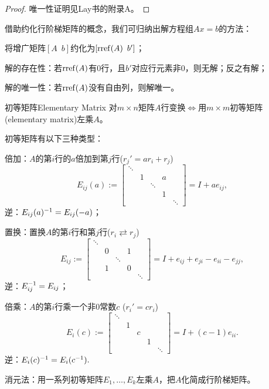 \begin{proof}
	唯一性证明见Lay书的附录A。
\end{proof}

\begin{remark}
	借助约化行阶梯矩阵的概念，我们可归纳出解方程组$Ax=b$的方法：
	\begin{compactitem}
		\item 将增广矩阵$[A\enspace b]$约化为$[\operatorname{rref}(A)\enspace b']$；
		\item 解的存在性：若$\operatorname{rref}(A)$有0行，且$b'$对应行元素非0，则无解；反之有解；
		\item 解的唯一性：若$\operatorname{rref}(A)$没有自由列，则解唯一。
	\end{compactitem}
\end{remark}

\begin{definition}{初等矩阵}{Elementary Matrix}
	对$m\times n$矩阵$A$行变换$\iff$用$m\times m$初等矩阵(elementary matrix)左乘$A$。
	
	初等矩阵有以下三种类型：
	\begin{compactitem}
		\item 倍加：$A$的第$i$行的$a$倍加到第$j$行($r_j'=ar_i+r_j$)
		\[
			E_{ij}(a):=
			\begin{bmatrix}
				\ddots\\ &1&&a\\ &&\ddots\\ &&&1\\ &&&&\ddots
			\end{bmatrix}=I+ae_{ij},
		\]
		逆：$E_{ij}(a)^{-1}=E_{ij}(-a)$；
		\item 置换：置换$A$的第$i$行和第$j$行($r_i\rightleftarrows r_j$)
		\[
			E_{ij}:=
			\begin{bmatrix}
				\ddots\\ &0&&1\\ &&\ddots\\ &1&&0\\ &&&&\ddots
			\end{bmatrix}=I+e_{ij}+e_{ji}-e_{ii}-e_{jj},
		\]
		逆：$E_{ij}^{-1}=E_{ij}$；
		\item 倍乘：$A$的第$i$行乘一个非0常数$c$ ($r_i'=cr_i$)
		\[
			E_i(c):=
			\begin{bmatrix}
				\ddots\\ &1\\ &&c\\ &&&1\\ &&&&\ddots
			\end{bmatrix}=I+(c-1)e_{ii}.
		\]
		逆：$E_i(c)^{-1}=E_i(c^{-1}).$
	\end{compactitem}
\end{definition}
消元法：用一系列初等矩阵$E_1,\ldots,E_k$左乘$A$，把$A$化简成行阶梯矩阵。

